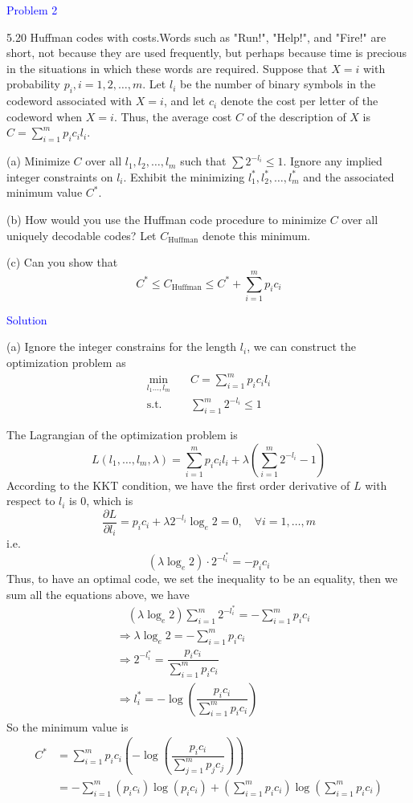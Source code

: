 \textcolor{blue}{Problem 2}

5.20 Huffman codes with costs.\quad Words such as "Run!", "Help!", and "Fire!" are short, not because they are used frequently, but perhaps because time is precious in the situations in which these words are required. Suppose that $X=i$ with probability $p_i,i=1,2,\ldots,m$. Let $l_i$ be the number of binary symbols in the codeword associated with $X=i$, and let $c_i$ denote the cost per letter of the codeword when $X=i.$ Thus, the average cost $C$ of the description of $X$ is $C=\sum\limits_{i=1}^mp_ic_il_i$.

(a) Minimize $C$ over all $l_1,l_2,\ldots,l_m$ such that $\sum2^{-l_i}\leq 1$. Ignore any implied integer constraints on $l_i$. Exhibit the minimizing $l_1^*,l_2^*,\ldots,l_m^*$ and the associated minimum value $C^*$.

(b) How would you use the Huffman code procedure to minimize $C$ over all uniquely decodable codes? Let $C_{\text{Huffman}}$ denote this minimum.

(c) Can you show that
$$C^*\leq C_\text{Huffman}\leq C^*+\sum_{i=1}^mp_ic_i$$

\textcolor{blue}{Solution}

(a) Ignore the integer constrains for the length $l_i$, we can construct the optimization problem as
\begin{align*}
\min\limits_{l_1\ldots,l_m} \quad & C=\sum_{i=1}^mp_ic_il_i \\
\text{s.t.} \quad & \sum_{i=1}^m2^{-l_i}\leq 1
\end{align*}

The Lagrangian of the optimization problem is
$$L(l_1,\ldots,l_m,\lambda)=\sum_{i=1}^mp_ic_il_i+\lambda\left(\sum_{i=1}^m2^{-l_i}-1\right)$$
According to the KKT condition, we have the first order derivative of $L$ with respect to $l_i$ is $0$, which is
$$\dfrac{\partial L}{\partial l_i}=p_ic_i+\lambda2^{-l_i}\log_e 2=0,\quad\forall i=1,\ldots,m$$
i.e.
$$\left(\lambda\log_e2\right)\cdot 2^{-l_i^*}=-p_ic_i$$
Thus, to have an optimal code, we set the inequality to be an equality, then we sum all the equations above, we have
\begin{align*}
&\quad \left(\lambda\log_e2\right)\sum_{i=1}^m2^{-l_i^*} = -\sum_{i=1}^mp_ic_i \\
&\Rightarrow \lambda\log_e2 = -\sum_{i=1}^mp_ic_i \\
&\Rightarrow 2^{-l_i^*} = \dfrac{p_ic_i}{\sum\limits_{i=1}^mp_ic_i} \\
&\Rightarrow l_i^* = -\log\left(\dfrac{p_ic_i}{\sum\limits_{i=1}^mp_ic_i}\right)
\end{align*}
So the minimum value is
\begin{align*}
C^* &= \sum_{i=1}^mp_ic_i\left(-\log\left(\dfrac{p_ic_i}{\sum\limits_{j=1}^mp_jc_j}\right)\right) \\
&= -\sum_{i=1}^m\left(p_ic_i\right)\log\left(p_ic_i\right) + \left(\sum_{i=1}^mp_ic_i\right)\log\left(\sum_{i=1}^mp_ic_i\right)
\end{align*}

